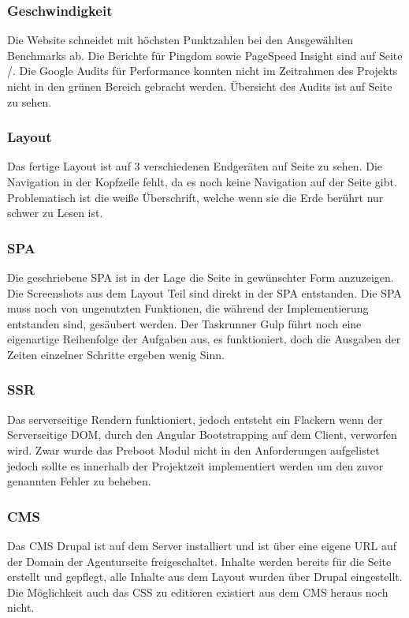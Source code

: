 \documentclass[11pt,a4paper]{article}
\begin{document}
\subsubsection{Geschwindigkeit}
Die Website schneidet mit höchsten Punktzahlen bei den Ausgewählten Benchmarks ab.
Die Berichte für Pingdom sowie PageSpeed Insight sind auf Seite  \pageref{sec:google}/\pageref{sec:pingdom}. Die Google Audits für Performance konnten nicht im Zeitrahmen des Projekts nicht in den grünen Bereich gebracht werden. Übersicht des Audits ist auf Seite \pageref{sec:audit}
zu sehen.
\subsubsection{Layout}
Das fertige Layout ist auf 3 verschiedenen Endgeräten auf Seite \pageref{sec:responsive}
zu sehen. Die Navigation in der Kopfzeile fehlt, da es noch keine Navigation auf der Seite gibt.
Problematisch ist die weiße Überschrift, welche wenn sie die Erde berührt nur schwer zu Lesen ist.
\subsubsection{SPA}
Die geschriebene SPA ist in der Lage die Seite in gewünschter Form anzuzeigen. Die Screenshots aus dem Layout Teil sind direkt in der SPA entstanden. Die SPA muss noch von ungenutzten Funktionen, die während der Implementierung entstanden sind, gesäubert werden. Der Taskrunner Gulp führt noch eine eigenartige Reihenfolge der Aufgaben aus,  es funktioniert, doch die Ausgaben der Zeiten einzelner Schritte ergeben wenig Sinn.
\subsubsection{SSR}
Das serverseitige Rendern funktioniert, jedoch entsteht ein Flackern wenn der Serverseitige DOM, durch den Angular Bootstrapping auf dem Client, verworfen wird. Zwar wurde das Preboot Modul nicht in den Anforderungen aufgelistet jedoch sollte es innerhalb der Projektzeit implementiert werden um den zuvor genannten Fehler zu beheben.
\subsubsection{CMS}
Das \acs{CMS} Drupal ist auf dem Server installiert und ist über eine eigene URL auf der Domain der Agenturseite freigeschaltet. Inhalte werden bereits für die Seite erstellt und gepflegt, alle Inhalte aus dem Layout wurden über Drupal eingestellt. Die Möglichkeit auch das CSS zu editieren existiert aus dem CMS heraus noch nicht. 
\end{document}
